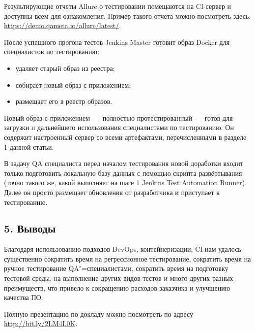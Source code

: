 \documentclass[10pt, a5paper]{article}
\begin{document}
Результирующие отчеты Allure о тестировании помещаются на CI-сервер и доступны всем для ознакомления. Пример такого отчета можно посмотреть здесь: \url{https://demo.qameta.io/allure/latest/}.

После успешного прогона тестов Jenkins Master готовит образ Docker для специалистов по тестированию:

\begin{itemize}
  \item удаляет старый образ из реестра;
  \item собирает новый образ с приложением;
  \item размещает его в реестр образов.
\end{itemize}

Новый образ с приложением~--- полностью протестированный~--- готов для загрузки и дальнейшего использования специалистами по тестированию. Он содержит настроенный сервер со всеми артефактами, перечисленными в разделе 1 данной статьи.

В задачу QA специалиста перед началом тестирования новой доработки входит только подготовить локальную базу данных с помощью скрипта развёртывания (точно такого же, какой выполняет на шаге 1 Jenkins Test Automation Runner). Далее он просто размещает обновления от разработчика и приступает к тестированию.

\subsection*{5. Выводы}

Благодаря использованию подходов DevOps, контейнеризации, CI нам удалось существенно сократить время на регрессионное тестирование, сократить время на ручное тестирование QA"=специалистами, сократить время на подготовку тестовой среды, на выполнение других видов тестов и много других разных преимуществ, что привело к сокращению расходов заказчика и улучшению качества ПО.

Полную презентацию по докладу можно посмотреть по адресу \url{http://bit.ly/2LM4L0K}.
\end{document}

